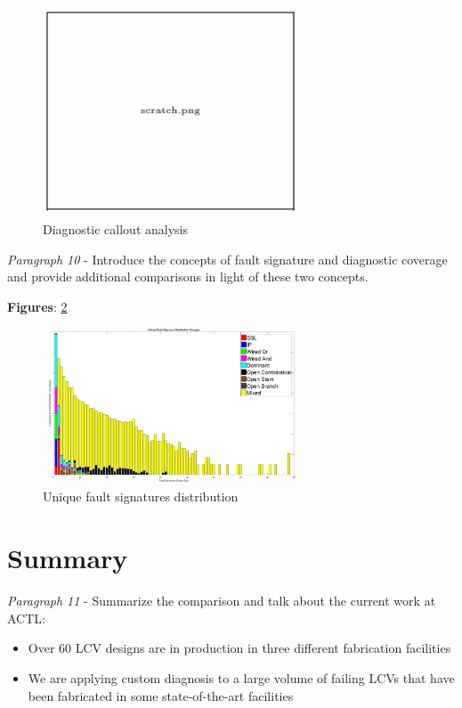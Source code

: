 \documentclass[journal]{IEEEtran}
\begin{document}
\begin{figure}[h]
	\centering
	\includegraphics[width=3in]{dummy}
	\caption{Diagnostic callout analysis}
	\label{fig_diag_res}
\end{figure}

\textit{Paragraph 10} - Introduce the concepts of fault signature and diagnostic coverage \cite{lcv_diag} and provide additional comparisons in light of these two concepts. 

\textbf{Figures}: \ref{fig_fault_sig}

\begin{figure}[h]
	\centering
	\includegraphics[width=3in]{fault_sig}
	\caption{Unique fault signatures distribution}
	\label{fig_fault_sig}
\end{figure}

\section{Summary} \label{summary}
\textit{Paragraph 11} - Summarize the comparison and talk about the current work at ACTL:
	\begin{itemize}
		\item Over 60 LCV designs are in production in three different fabrication facilities
		\item We are applying custom diagnosis to a large volume of failing LCVs that have been fabricated in some state-of-the-art facilities 
	\end{itemize}
\end{document}
